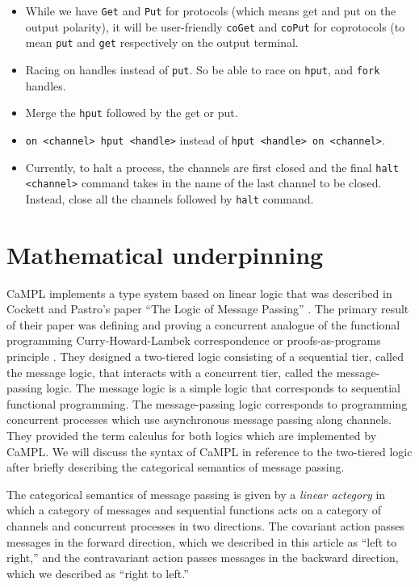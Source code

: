 \documentclass[acmsmall]{acmart}
\begin{document}
\begin{itemize}
	\item While we have \texttt{Get} and \texttt{Put} for protocols (which means get and put on the output polarity), it will be user-friendly \texttt{coGet} and \texttt{coPut} for coprotocols (to mean \texttt{put} and \texttt{get} respectively on the output terminal.
	\item Racing on handles instead of \texttt{put}. So be able to race on \texttt{hput}, and \texttt{fork} handles.
	\item Merge the \texttt{hput} followed by the get or put. 
	\item \texttt{on <channel> hput <handle>} instead of \texttt{hput <handle> on <channel>}. 
	\item Currently, to halt a process, the channels are first closed and the final \texttt{halt <channel>} command takes in the name of the last channel to be closed. Instead, close all the channels followed by \texttt{halt} command.
\end{itemize}
\fi

\section{Mathematical underpinning}
\label{Sec:math_underp}

CaMPL implements a type system based on linear logic that was described in Cockett and Pastro’s paper ``The Logic of Message Passing'' \cite{CoP07}. The primary result of their paper was defining and proving a concurrent analogue of the functional programming Curry-Howard-Lambek correspondence or proofs-as-programs principle \cite{Howard1980, Lambek1969, Lambek1972}. They designed a two-tiered logic consisting of a sequential tier, called the message logic, that interacts with a concurrent tier, called the message-passing logic. 
The message logic is a simple logic that corresponds to sequential functional programming.
The message-passing logic corresponds to programming concurrent processes which use asynchronous message passing along channels. They provided the term calculus for both logics \cite[Section 2.1, Section 3.1]{CoP07} which are implemented by CaMPL. We will discuss the syntax of CaMPL in reference to the two-tiered logic after briefly describing the categorical semantics of message passing.

The categorical semantics of message passing is given by a {\em linear actegory} in which a category of messages and sequential functions acts on a category of channels and concurrent processes in two directions.
The covariant action passes messages in the forward direction, which we described in this article as ``left to right,'' and the contravariant action passes messages in the backward direction, which we described as ``right to left.''
\end{document}

